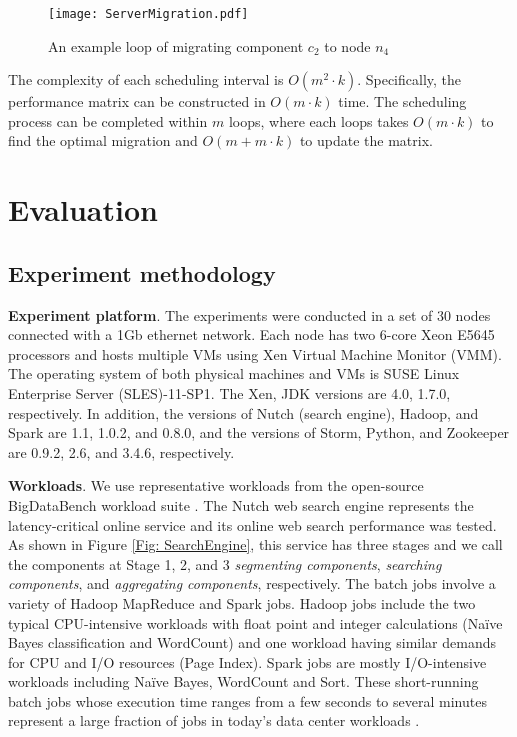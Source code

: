 \documentclass[10pt, conference, compsocconf]{IEEEtran}
\begin{document}
\begin{figure}
\centering
  \texttt{[image: ServerMigration.pdf]}\\
  \caption{An example loop of migrating component $c_2$ to node $n_4$}
  \label{Fig: ServerMigration}
\end{figure}

The complexity of each scheduling interval is $O(m^2 \cdot k)$. Specifically, the performance matrix can be constructed in $O(m \cdot k)$ time. The scheduling process can be completed within $m$ loops, where each loops takes $O(m \cdot k)$ to find the optimal migration and $O(m+ m \cdot k)$ to update the matrix.

\section{Evaluation}  \label{Section: Evaluation}
\subsection{Experiment methodology} \label{Section: Experiment methodology}
\textbf{Experiment platform}. The experiments were conducted in a set of 30 nodes connected with a 1Gb ethernet network. Each node has two 6-core Xeon E5645 processors and hosts multiple VMs using Xen Virtual Machine Monitor (VMM). The operating system of both physical machines and VMs is SUSE Linux Enterprise Server (SLES)-11-SP1. The Xen, JDK versions are 4.0, 1.7.0, respectively. In addition, the versions of Nutch (search engine), Hadoop, and Spark are 1.1, 1.0.2, and 0.8.0, and the versions of Storm, Python, and Zookeeper are 0.9.2, 2.6, and 3.4.6, respectively.



\textbf{Workloads}. We use representative workloads from the open-source BigDataBench workload suite \cite{opensourceBigDataBench}. The Nutch web search engine \cite{nutchsearch} represents the latency-critical online service and its online web search performance was tested. As shown in Figure \ref{Fig: SearchEngine}, this service has three stages and we call the components at Stage 1, 2, and 3 \emph{segmenting components}, \emph{searching components}, and \emph{aggregating components}, respectively.
The batch jobs involve a variety of Hadoop MapReduce and Spark jobs.
Hadoop jobs include the two typical CPU-intensive workloads with float point and integer calculations (Na\"{i}ve Bayes classification and WordCount) and one workload having similar demands for CPU and I/O resources (Page Index).
Spark jobs are mostly I/O-intensive workloads including Na\"{i}ve Bayes, WordCount and Sort.
These short-running batch jobs whose execution time ranges from a few seconds to several minutes represent a large fraction of jobs in today's data center workloads \cite{reiss2012heterogeneity,chen2012interactive}.
\end{document}

